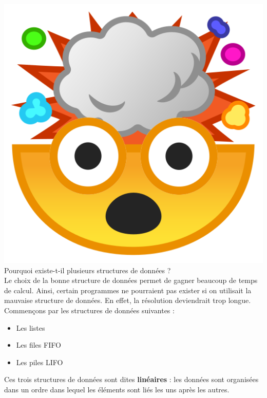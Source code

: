 \documentclass{report}
\begin{document}
\includegraphics[scale=0.03]{mindblow}{\selectfont
Pourquoi existe-t-il plusieurs structures de données ?\\
}
Le choix de la bonne structure de données permet de gagner beaucoup de temps de calcul. Ainsi, certain programmes ne pourraient pas exister si on utilisait la mauvaise structure de données. En effet, la résolution deviendrait trop longue.\\



Commençons par les structures de données suivantes :
\begin{itemize}
    \item Les listes
    \item Les files FIFO
    \item Les piles LIFO
\end{itemize}

\begin{tcolorbox}[enhanced,
    colback=green!25!black!10!white,colframe=green!75!black,title=Structuress linéaires,
    drop fuzzy shadow,watermark color=white]
Ces trois structures de données sont dites \textbf{linéaires} : les données sont organisées dans un ordre dans lequel les éléments sont liés les uns après les autres.
\end{tcolorbox}
\end{document}
